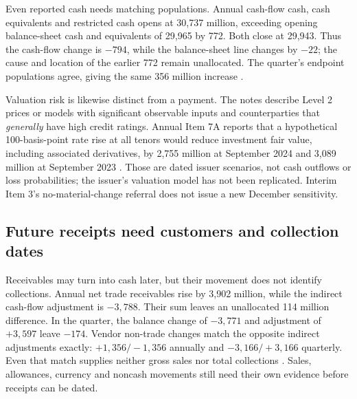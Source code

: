 Even reported cash needs matching populations. Annual cash-flow cash, cash
equivalents and restricted cash opens at 30,737 million, exceeding opening
balance-sheet cash and equivalents of 29,965 by 772. Both close at 29,943.
Thus the cash-flow change is $-794$, while the balance-sheet line changes by
$-22$; the cause and location of the earlier 772 remain unallocated. The
quarter's endpoint populations agree, giving the same 356 million increase
\citep[balance and cash-flow statements]{apple2024,apple2025q1}.

Valuation risk is likewise distinct from a payment. The notes describe Level 2
prices or models with significant observable inputs and counterparties that
\emph{generally} have high credit ratings. Annual Item 7A reports that a
hypothetical 100-basis-point rate rise at all tenors would reduce investment
fair value, including associated derivatives, by 2,755 million at September
2024 and 3,089 million at September 2023 \citep[printed p.~27]{apple2024}.
Those are dated issuer scenarios, not cash outflows or loss probabilities;
the issuer's valuation model has not been replicated. Interim Item 3's
no-material-change referral does not issue a new December sensitivity.

\subsection{Future receipts need customers and collection dates}

Receivables may turn into cash later, but their movement does not identify
collections. Annual net trade receivables rise by 3,902 million, while the
indirect cash-flow adjustment is $-3{,}788$. Their sum leaves an unallocated
114 million difference. In the quarter, the balance change of $-3{,}771$
and adjustment of $+3{,}597$ leave $-174$. Vendor non-trade changes match
the opposite indirect adjustments exactly: $+1{,}356/-1{,}356$ annually
and $-3{,}166/+3{,}166$ quarterly. Even that match supplies neither gross
sales nor total collections \citep[balance and cash-flow statements]{apple2024,apple2025q1}.
Sales, allowances, currency and noncash movements still need their own
evidence before receipts can be dated.

